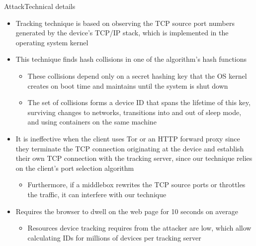 \documentclass[a4paper]{article}
\begin{document}
\begin{frame}[fragile]{Attack}{Technical details}
\begin{itemize}
\begin{itemize}
		\end{itemize}
		\item Tracking technique is based on observing the TCP source port numbers generated by the device’s TCP/IP stack, which is implemented in the operating system kernel
		\item This technique finds hash collisions in one of the algorithm’s hash functions
		\begin{itemize}
			\item These collisions depend only on a secret hashing key that the OS kernel creates on boot time and maintains until the system is shut down
			\item The set of collisions forms a device ID that spans the lifetime of this key, surviving changes to networks, transitions into and out of sleep mode, and using containers on the same machine
		\end{itemize}
		\item It is ineffective when the client uses Tor or an HTTP forward proxy since they terminate the TCP connection originating at the device and establish their own TCP connection with the tracking server, since our technique relies on the client’s port selection algorithm
		\begin{itemize}
			\item Furthermore, if a middlebox rewrites the TCP source ports or throttles the traffic, it can interfere with our technique
		\end{itemize}
		\item Requires the browser to dwell on the web page for 10 seconds on average
		\begin{itemize}
			\item Resources device tracking requires from the attacker are low, which allow calculating IDs for millions of devices per tracking server
		\end{itemize}
	\end{itemize}
\end{frame}
\end{document}
